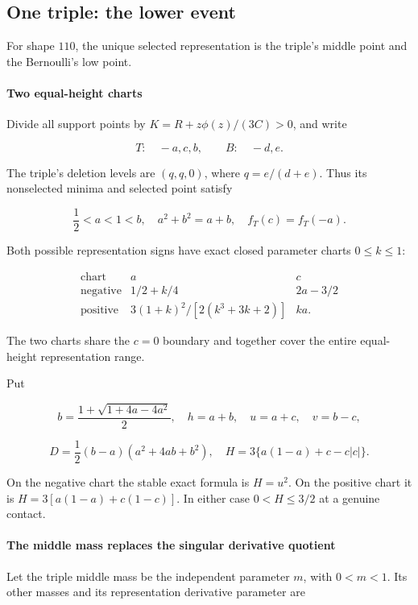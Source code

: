\subsection{One triple: the lower event}\label{contact:lower-110-contact-reduction}


For shape $110$, the unique selected representation is the triple's middle point and the Bernoulli's low point.

\paragraph{Two equal-height charts}

Divide all support points by
$K=R+z \phi(z)/(3C)>0$, and write

\[
 T:\quad -a,c,b,\qquad B:\quad -d,e.
\]

The triple's deletion levels are $(q,q,0)$, where $q=e/(d+e)$.
Thus its nonselected minima and selected point satisfy

\[
 \frac12<a<1<b,\quad a^2+b^2=a+b,\quad f_T(c)=f_T(-a).
\]

Both possible representation signs have exact closed parameter charts $0\le k\le 1$:

\[
 \begin{array}{c|c|c}
 \text{chart}&a&c\\ \hline
 \text{negative}&1/2+k/4&2a-3/2\\
 \text{positive}&3(1+k)^2/[2(k^3+3k+2)]&ka.
 \end{array}
\tag{B.13.1}\label{contact:lower-110-contact-reduction-1}
\]

The two charts share the $c=0$ boundary and together cover the entire
equal-height representation range.

Put

\[
 b=\frac{1+\sqrt{1+4a-4a^2}}2,\quad h=a+b,\quad
 u=a+c,\quad v=b-c,
\]

\[
 D=\frac12(b-a)(a^2+4ab+b^2),\quad
 H=3\{a(1-a)+c-c|c|\}.
\]

On the negative chart the stable exact formula is $H=u^2$. On the
positive chart it is $H=3[a(1-a)+c(1-c)]$. In either case $0<H\le 3/2$
at a genuine contact.

\paragraph{The middle mass replaces the singular derivative quotient}

Let the triple middle mass be the independent parameter $m$, with
$0<m<1$. Its other masses and its representation derivative parameter are

